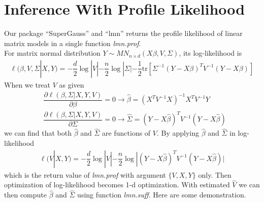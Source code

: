 \documentclass[12pt,letterpaper]{article}\usepackage[]{graphicx}\usepackage[]{color}
\theoremstyle{definition}\newtheorem*{conject}{Conjecture}
\begin{document}
\section{Inference With Profile Likelihood}
Our package ``SuperGauss'' and ``lmn'' returns the profile likelihood of linear matrix models in a single function \textit{lmn.prof}. \\
For matrix normal distribution $Y \sim MN_{n\times d}(X \beta, V, \Sigma)$, its log-likelihood is
\begin{align*}
	\ell(\beta, V, \Sigma | X, Y) = -\dfrac{d}{2} \log|V| - \dfrac{n}{2} \log|\Sigma| - \dfrac{1}{2} \text{tr} \left[ \Sigma^{-1} (Y - X \beta)^T V^{-1} (Y - X \beta) \right]
\end{align*}
When we treat $V$ as given
\begin{align*}
	& \dfrac{\partial \ell(\beta, \Sigma | X, Y, V)}{\partial \beta} = 0 \rightarrow \widehat{\beta} = \left(X^T V^{-1} X\right)^{-1}X^T V^{-1} Y \\
	& \dfrac{\partial \ell(\beta, \Sigma | X, Y, V)}{\partial \Sigma} = 0 \rightarrow \widehat{\Sigma} = \left(Y - X\widehat{\beta} \right)^T V^{-1} \left(Y - X\widehat{\beta} \right)
\end{align*}
we can find that both $\widehat{\beta}$ and $\widehat{\Sigma}$ are functions of $V$. By applying $\widehat{\beta}$ and $\widehat{\Sigma}$ in log-likelihood
\begin{align*}
	\ell(V | X, Y) = -\dfrac{d}{2} \log|V| - \dfrac{n}{2} \log|\left(Y - X\widehat{\beta} \right)^T V^{-1} \left(Y - X\widehat{\beta} \right)|
\end{align*}
which is the return value of \textit{lmn.prof} with argument $\{V, X, Y\}$ only. Then optimization of  log-likelihood becomes 1-d optimization. With estimated $\widehat{V}$ we can then compute $\widehat{\beta}$ and $\widehat{\Sigma}$ using function \textit{lmn.suff}. Here are some demonstration.
\end{document}
